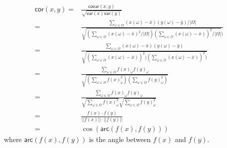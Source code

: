 \begin{solution}
$$\begin{aligned}
\textsf{cor}(x,y) =& \frac{\mathsf{covar}(x,y)}{\sqrt{\mathsf{var}(x)\mathsf{var}(y)}}\\
= & \frac{\sum_{\omega \in \Omega} (x(\omega) - \bar{x}) (y(\omega) - \bar{y})/|\Omega|}{\sqrt{(\sum_{\omega \in \Omega} (x(\omega) - \bar{x})^2/|\Omega|)(\sum_{\omega \in \Omega} (x(\omega) - \bar{x}))^2/|\Omega|})} \\
= & \frac{\sum_{\omega \in \Omega} (x(\omega) - \bar{x}) (y(\omega) - \bar{y})}{\sqrt{(\sum_{\omega \in \Omega} (x(\omega) - \bar{x}))^2)(\sum_{\omega \in \Omega} (x(\omega) - \bar{x}))^2)}} \\
= & \frac{\sum_{\omega \in \Omega} f(x)_{\omega} f(y)_{\omega}}{\sqrt{(\sum_{\omega \in \Omega} f(x)_{\omega}^2)(\sum_{\omega \in \Omega} f(y)_{\omega}^2)}} \\
= & \frac{\sum_{\omega \in \Omega} f(x)_{\omega} f(y)_{\omega}}{\sqrt{\sum_{\omega \in \Omega} f(x)_{\omega}^2}\sqrt{\sum_{\omega \in \Omega} f(y)_{\omega}^2}} \\
= &  \frac{f(x)\cdot f(y)}{||f(x)|| \cdot ||f(y)||} \\
= & \cos(\textsf{arc}(f(x), f(y)))
\end{aligned} $$
where $\textsf{arc}(f(x), f(y))$ is the angle between $f(x)$ and $f(y)$.
\end{solution}

